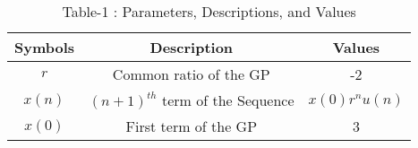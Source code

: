 \begin{table*}[ht!]
\centering
\begin{tabular}{ |c|c|c| } 
 \hline
Symbols & Description & Values  \\
\hline
 $r$ & Common ratio of the GP & -2\\
 \hline
 $x(n)$ & $(n+1)^{th}$ term of the Sequence & $x(0)r^{n}u(n)$\\
 \hline
 $x(0)$ & First term of the GP & 3\\
\hline
\end{tabular}
\caption{Table-1 : Parameters, Descriptions, and Values}
\label{table:ee25-tab2}
\end{table*}




